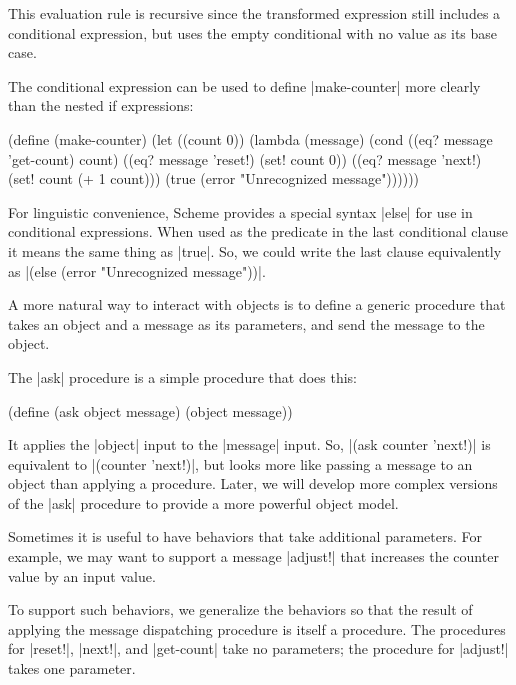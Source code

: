 \begin{schemeregion}
This evaluation rule is recursive since the transformed expression still includes a conditional expression, but uses the empty conditional with no value as its base case.

The conditional expression can be used to define \scheme|make-counter| more clearly than the nested if expressions:
\begin{schemedisplay}
(define (make-counter)
  (let ((count 0))
    (lambda (message)
      (cond ((eq? message 'get-count) count)
            ((eq? message 'reset!)    (set! count 0))
            ((eq? message 'next!)     (set! count (+ 1 count)))            
            (true (error "Unrecognized message"))))))
\end{schemedisplay}

For linguistic convenience, Scheme provides a special syntax \scheme|else| for use in conditional expressions.  When used as the predicate in the last conditional clause it means the same thing as \scheme|true|.  So, we could write the last clause equivalently as \scheme|(else (error "Unrecognized message"))|.

  A more natural way to interact with objects is to define a generic procedure that takes an object and a message as its parameters, and send the message to the object. 

The \scheme|ask| procedure is a simple procedure that does this:
\begin{schemedisplay}
(define (ask object message) (object message))
\end{schemedisplay}

It applies the \scheme|object| input to the \scheme|message| input.  So, \scheme|(ask counter 'next!)| is equivalent to \scheme|(counter 'next!)|, but looks more like passing a message to an object than applying a procedure.  Later, we will develop more complex versions of the \scheme|ask| procedure to provide a more powerful object model.

 Sometimes it is useful to have behaviors that take additional parameters.  For example, we may want to support a message \scheme|adjust!| that increases the counter value by an input value.  

To support such behaviors, we generalize the behaviors so that the result of applying the message dispatching procedure is itself a procedure.  The procedures for \scheme|reset!|, \scheme|next!|, and \scheme|get-count| take no parameters; the procedure for \scheme|adjust!| takes one parameter.


\end{schemeregion}
